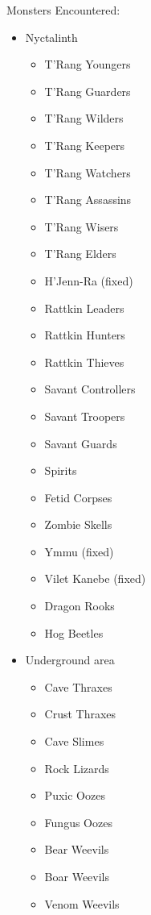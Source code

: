 \documentclass[12pt]{article}
\providecommand{\tightlist}{%
  \setlength{\itemsep}{0pt}\setlength{\parskip}{0pt}}
\newcommand{\indexPlace}[1]{\index{#1}}
\newcommand{\place}[1]{#1\indexPlace{#1}}
\newcommand{\WviiTwoColumnSetup}{\raggedcolumns\RaggedRight}
\begin{document}
Monsters Encountered:
\begin{multicols}{2}\WviiTwoColumnSetup
\begin{itemize}
\item \place{Nyctalinth}
  \begin{itemize}
    \tightlist
  \item T'Rang Youngers
  \item T'Rang Guarders
  \item T'Rang Wilders
  \item T'Rang Keepers
  \item T'Rang Watchers
  \item T'Rang Assassins
  \item T'Rang Wisers
  \item T'Rang Elders
  \item H'Jenn-Ra (fixed)
  \item Rattkin Leaders
  \item Rattkin Hunters
  \item Rattkin Thieves
  \item Savant Controllers
  \item Savant Troopers
  \item Savant Guards
  \item Spirits
  \item Fetid Corpses
  \item Zombie Skells
  \item Ymmu (fixed)
  \item Vilet Kanebe (fixed)
  \item Dragon Rooks
  \item Hog Beetles
  \end{itemize}

\item Underground area
  \begin{itemize}
    \tightlist
  \item Cave Thraxes
  \item Crust Thraxes
  \item Cave Slimes
  \item Rock Lizards
  \item Puxic Oozes
  \item Fungus Oozes
  \item Bear Weevils
  \item Boar Weevils
  \item Venom Weevils
  \end{itemize}
\end{itemize}
\end{multicols}
\end{document}

